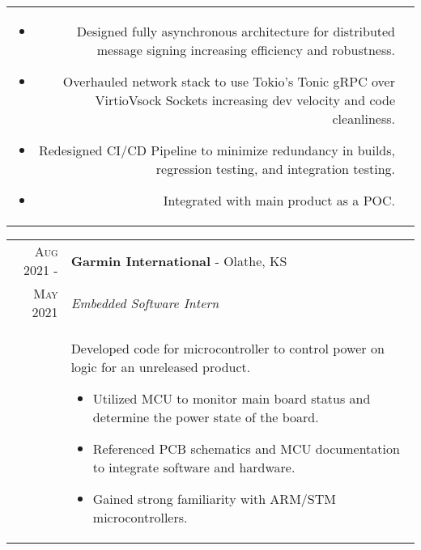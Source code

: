 \documentclass[a4paper,12pt]{article}
\begin{document}
\begin{tabularx}{\textwidth}{r|X}
\begin{itemize}[leftmargin=20pt,topsep=1pt,itemsep=1pt,partopsep=0pt, parsep=1pt]
            \begin{itemize}[leftmargin=20pt,topsep=1pt,itemsep=1pt,partopsep=0pt, parsep=1pt]
              \item Designed fully asynchronous architecture for distributed message signing increasing efficiency and robustness.
              \item Overhauled network stack to use Tokio's Tonic gRPC over VirtioVsock Sockets increasing dev velocity and code cleanliness.
              \item Redesigned CI/CD Pipeline to minimize redundancy in builds, regression testing, and integration testing.
              \item Integrated with main product as a POC.
            \end{itemize}
      \vspace{-0.5cm}
      \end{itemize}\\
\end{tabularx}

%
%
\begin{tabularx}{\textwidth}{r|X}
   \textsc{Aug 2021 \--} & \textbf{Garmin International} \-- Olathe, KS\\
   \textsc{May 2021} & \emph{Embedded Software Intern}\\
   & \small{Developed code for microcontroller to control power on logic for an unreleased product.
      \begin{itemize}[leftmargin=20pt,topsep=1pt,itemsep=1pt,partopsep=0pt, parsep=1pt]
        \item Utilized MCU to monitor main board status and determine the power state of the board.
        \item Referenced PCB schematics and MCU documentation to integrate software and hardware.
        \item Gained strong familiarity with ARM/STM microcontrollers.
      \vspace{-0.5cm}
      \end{itemize}}\\
\end{tabularx}
\end{document}
